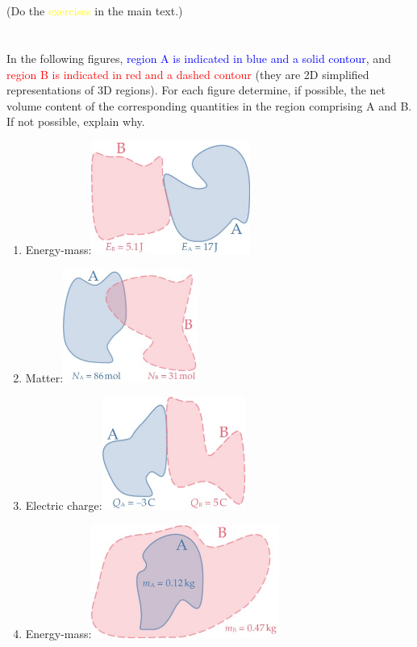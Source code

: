 \documentclass[a4paper,12pt,%
onecolumn,oneside,%
british%
]{memoir}
\renewcommand*{\|}[1][]{\nonscript\:#1\vert\nonscript\:\mathopen{}}
\begin{document}
\section{}
(Do the \textcolor{yellow}{exercises} in the main text.)


\section{}
\label{sec:contents}

In the following figures, \textcolor{blue}{region A is indicated in blue and a solid contour}, and \textcolor{red}{region B is indicated in red and a dashed contour} (they are 2D simplified representations of 3D regions). For each figure determine, if possible, the net volume content of the corresponding quantities in the region comprising A and B. If not possible, explain why.

\begin{enumerate}[exerc,itemsep=2ex]
\item Energy-mass:\qquad \includegraphics[align=c,height=10em]{images/ex_AB_J1.jpg}%
\item Matter:\qquad \includegraphics[align=c,height=10em]{images/ex_AB_mol1.jpg}%
\item Electric charge:\qquad \includegraphics[align=c,height=10em]{images/ex_AB_C1.jpg}%
\item Energy-mass:\qquad \includegraphics[align=c,height=10em]{images/ex_AB_kgin.jpg}%
\end{enumerate}
\end{document}
